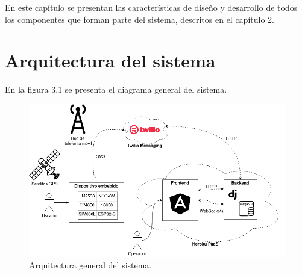 En este capítulo se presentan las características de diseño y desarrollo de todos los componentes que forman parte del sistema, descritos en el capítulo 2.

\section{Arquitectura del sistema}

En la figura 3.1 se presenta el diagrama general del sistema.

\begin{figure}[H]
	\centering
	\includegraphics[width=1\textwidth]{./Figures/arquitectura.png}
	\caption{Arquitectura general del sistema.}
	\label{fig:texmaker}
\end{figure}


